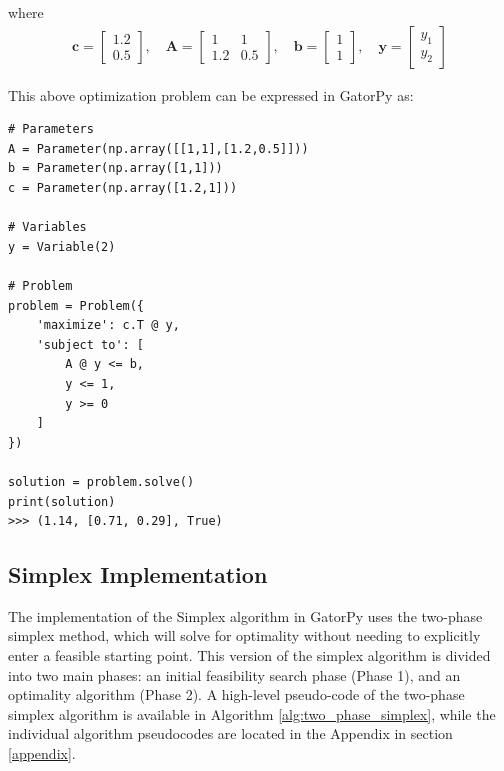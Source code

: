\documentclass[conference]{IEEEtran}
\begin{document}
where
\begin{align*}
    \textbf{c} = \begin{bmatrix} 1.2 \\ 0.5 \end{bmatrix}, \quad
    \textbf{A} = \begin{bmatrix} 1 & 1 \\ 1.2 & 0.5 \end{bmatrix}, \quad
    \textbf{b} = \begin{bmatrix} 1 \\ 1 \end{bmatrix}, \quad
    \textbf{y} = \begin{bmatrix} y_1 \\ y_2  \end{bmatrix}
\end{align*}

This above optimization problem can be expressed in GatorPy as:
\begin{lstlisting}[style=mypython, caption={Solving a Linear Program Symbolically}]
# Parameters
A = Parameter(np.array([[1,1],[1.2,0.5]]))
b = Parameter(np.array([1,1]))
c = Parameter(np.array([1.2,1]))

# Variables
y = Variable(2)

# Problem
problem = Problem({
    'maximize': c.T @ y,
    'subject to': [
        A @ y <= b,
        y <= 1,
        y >= 0
    ]
})

solution = problem.solve()
print(solution)
>>> (1.14, [0.71, 0.29], True)
\end{lstlisting}

\subsection{Simplex Implementation}
\label{Simplex}
The implementation of the Simplex algorithm in GatorPy uses  the two-phase simplex method, which will solve for optimality without needing to explicitly enter a feasible starting point.
This version of the simplex algorithm is divided into two main phases: an initial feasibility search phase (Phase 1), and an optimality algorithm (Phase 2). 
A high-level pseudo-code of the two-phase simplex algorithm is available in Algorithm \ref{alg:two_phase_simplex}, while the individual algorithm pseudocodes are located in the Appendix in section \ref{appendix}.
\end{document}
